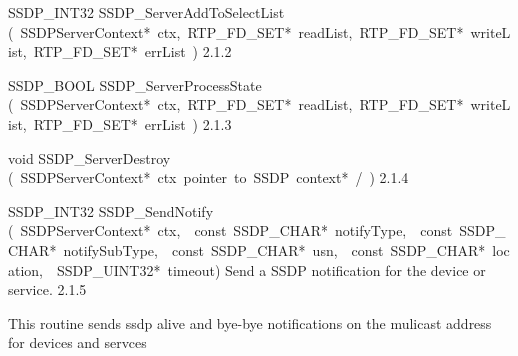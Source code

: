 \documentclass{article}
\begin{document}
\begin{cxxentry}
\begin{cxxentry}
\begin{cxxfunction}
\begin{cxxdoc}
\end{cxxdoc}
\end{cxxfunction}
\begin{cxxfunction}
{SSDP\_INT32}
        {SSDP\_ServerAddToSelectList}
        {(\ SSDPServerContext*\ ctx,\ RTP\_FD\_SET*\ readList,\ RTP\_FD\_SET*\ writeList,\ RTP\_FD\_SET*\ errList\ )}
        {}
        {2.1.2}
\end{cxxfunction}
\begin{cxxfunction}
{SSDP\_BOOL}
        {SSDP\_ServerProcessState}
        {(\ SSDPServerContext*\ ctx,\ RTP\_FD\_SET*\ readList,\ RTP\_FD\_SET*\ writeList,\ RTP\_FD\_SET*\ errList\ )}
        {}
        {2.1.3}
\end{cxxfunction}
\begin{cxxfunction}
{void}
        {SSDP\_ServerDestroy}
        {(\ SSDPServerContext*\ ctx\ pointer\ to\ SSDP\ context*\ /\ )}
        {}
        {2.1.4}
\end{cxxfunction}
\begin{cxxfunction}
{SSDP\_INT32}
        {SSDP\_SendNotify}
        {(\ SSDPServerContext*\ ctx,\ \ const\ SSDP\_CHAR*\ notifyType,\ \ const\ SSDP\_CHAR*\ notifySubType,\ \ const\ SSDP\_CHAR*\ usn,\ \ const\ SSDP\_CHAR*\ location,\ \ SSDP\_UINT32*\ timeout)}
        {Send a SSDP notification for the device or service. }
        {2.1.5}
\begin{cxxdoc}
This routine sends ssdp alive and bye-bye notifications on the mulicast
address for devices and servces



\end{cxxdoc}
\end{cxxfunction}
\end{cxxentry}
\end{cxxentry}
\end{document}
